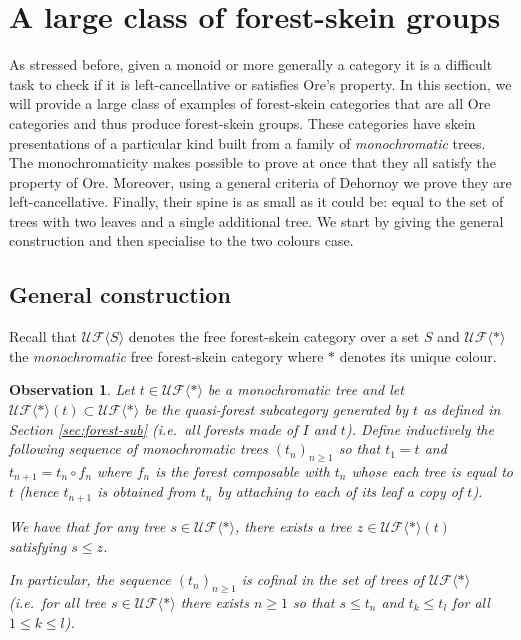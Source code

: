 \documentclass[a4paper, 12pt]{amsart}
\numberwithin{equation}{section}
\newtheorem{observation}[theorem]{Observation}
\theoremstyle{definition}
\newcommand{\la}{\langle}
\newcommand{\ra}{\rangle}
\newcommand{\cUF}{\mathcal{UF}}
\begin{document}
\section{A large class of forest-skein groups}\label{sec:class-example}

As stressed before, given a monoid or more generally a category it is a difficult task to check if it is left-cancellative or satisfies Ore's property.
In this section, we will provide a large class of examples of forest-skein categories that are all Ore categories and thus produce forest-skein groups. 
These categories have skein presentations of a particular kind built from a family of {\it monochromatic} trees. 
The monochromaticity makes possible to prove at once that they all satisfy the property of Ore. 
Moreover, using a general criteria of Dehornoy we prove they are left-cancellative. 
Finally, their spine is as small as it could be: equal to the set of trees with two leaves and a single additional tree.
We start by giving the general construction and then specialise to the two colours case.

\subsection{General construction}

Recall that $\cUF\la S\ra$ denotes the free forest-skein category over a set $S$ and $\cUF\la *\ra$ the {\it monochromatic} free forest-skein category where $*$ denotes its unique colour.

\begin{observation}
Let $t\in\cUF\la*\ra$ be a monochromatic tree and let $\cUF\la*\ra(t)\subset \cUF\la*\ra$ be the quasi-forest subcategory generated by $t$ as defined in Section \ref{sec:forest-sub} (i.e.~all forests made of $I$ and $t$).
Define inductively the following sequence of monochromatic trees $(t_n)_{n\geq 1}$ so that $t_1=t$ and $t_{n+1}=t_n \circ f_n$ where $f_n$ is the forest composable with $t_n$ whose each tree is equal to $t$ (hence $t_{n+1}$ is obtained from $t_n$ by attaching to each of its leaf a copy of $t$).

We have that for any tree $s\in\cUF\la*\ra$, there exists a tree $z\in\cUF\la*\ra(t)$ satisfying $s\leq z$.

In particular, the sequence $(t_n)_{n\geq 1}$ is cofinal in the set of trees of $\cUF\la*\ra$ (i.e.~for all tree $s\in \cUF\la*\ra$ there exists $n\geq 1$ so that $s\leq t_n$ and $t_k\leq t_l$ for all  $1\leq k\leq l$).
\end{observation}
\end{document}
